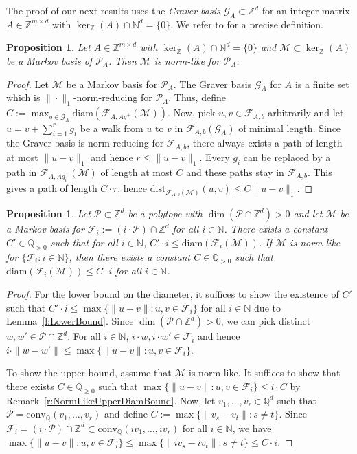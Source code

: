 \documentclass[11pt]{amsart}
\newtheorem{prop}[thm]{Proposition}
\theoremstyle{definition}
\numberwithin{equation}{section}
\newcommand{\ring}[1]{\ensuremath{\mathbb{#1}}}
\renewcommand{\>}{\rangle}
\newcommand{\<}{\langle}
\newcommand{\0}{\mathbf{0}}
\newcommand{\1}{\mathbf{1}}
\newcommand{\2}{\mathbf{2}}
\newcommand\NN{\ring{N}}
\newcommand\QQ{\ring{Q}}
\newcommand\ZZ{\ring{Z}}
\newcommand\cF{{\mathcal F}}
\newcommand\cM{{\mathcal M}}
\newcommand\cP{{\mathcal P}}
\newcommand{\fiber}[2]{\mathcal{F}_{#1,#2}}
\newcommand{\fibergraph}[3]{\mathcal{F}_{#1,#2}\left(#3\right)}
\newcommand{\graver}[1]{\mathcal{G}_{#1}}
\newcommand{\diam}[1]{\mathrm{diam}(#1)}
\newcommand{\dist}[3]{\mathrm{dist}_{#1}(#2,#3)}
\newcommand{\conv}[1]{\mathrm{conv}_\QQ(#1)}
\begin{document}
The proof of our next results uses the \emph{Graver basis}
$\graver{A}\subset\ZZ^d$ for an integer matrix $A\in\ZZ^{m\times d}$
with $\ker_\ZZ(A)\cap\NN^d=\{0\}$. We refer to
\cite[Chapter~3]{Loera2013} for a precise definition.

\begin{prop}\label{p:EveryMBIsNormLike}
Let $A\in\ZZ^{m\times d}$ with $\ker_\ZZ(A)\cap\NN^d=\{0\}$ and
$\cM\subset\ker_\ZZ(A)$ be a Markov basis of $\cP_A$. Then $\cM$ is
norm-like for $\cP_A$.
\end{prop}
\begin{proof}
Let $\cM$ be a Markov basis for $\cP_A$.
The Graver basis $\graver{A}$ for $A$ is a finite set which is
$\|\cdot\|_1$-norm-reducing for $\cP_A$. 
Thus, define
$C:=\max_{g\in\graver{A}}\diam{\fibergraph{A}{Ag^+}{\cM}}$.
Now, pick $u,v\in\fiber{A}{b}$ arbitrarily and let
$u=v+\sum_{i=1}^r g_i$ be a walk from $u$ to $v$ in
$\fibergraph{A}{b}{\graver{A}}$ of minimal length. Since the Graver
basis is norm-reducing for $\fiber{A}{b}$, there always exists a path
of length at most $\|u-v\|_1$ and hence $r\le\|u-v\|_1$. Every $g_i$
can be replaced by a path in $\fibergraph{A}{Ag_i^+}{\cM}$ of length
at most $C$ and these paths stay in $\fiber{A}{b}$. This gives a path
of length $C\cdot r$, hence $\dist{\fibergraph{A}{b}{\cM}}{u}{v}\le
C\|u-v\|_1$.
\end{proof}



\begin{prop}\label{p:DiamBounds}
Let $\cP\subset\ZZ^d$ be a polytope with $\dim(\cP\cap\ZZ^d)>0$ and let $\cM$ be a Markov
basis for $\cF_i:=(i\cdot\cP)\cap\ZZ^d$ for all $i\in\NN$.
There exists a constant $C'\in\QQ_{>0}$ such that for all $i\in\NN$,
$C'\cdot i\le\diam{\cF_i(\cM)}$. If $\cM$ is norm-like for $\{\cF_i:
i\in\NN\}$, then there exists a constant $C\in\QQ_{>0}$ such that 
$\diam{\cF_i(\cM)}\le C\cdot i$ for all $i\in\NN$.
\end{prop}
\begin{proof}
For the lower bound on the diameter, it suffices to show the existence
of $C'$ such that $C'\cdot i\le\max\{\|u-v\|: u,v\in\cF_i\}$ for all
$i\in\NN$ due to Lemma~\ref{l:LowerBound}. Since
$\dim(\cP\cap\ZZ^d)>0$, we can pick distinct $w,w'\in
\cP\cap\ZZ^d$. For all $i\in\NN$, $i\cdot w,i\cdot w'\in\cF_i$
and hence $i\cdot\|w-w'\|\le\max\{\|u-v\|: u,v\in\cF_i\}$. 

To show the upper bound, assume that $\cM$ is norm-like. It suffices
to show that there exists $C\in\QQ_{\ge 0}$ such that $\max\{\|u-v\|:
u,v\in \cF_i\}\le i\cdot C$ by Remark~\ref{r:NormLikeUpperDiamBound}.
Now, let $v_1,\ldots,v_r\in\QQ^d$ such that
$\cP=\conv{v_1,\ldots,v_r}$ and define $C:=\max\{\|v_s-v_t\|: s\neq
t\}$. 
Since $\cF_i=(i\cdot
\cP)\cap\ZZ^d\subset\conv{iv_1,\ldots,iv_r}$ for all
$i\in\NN$, we have
$\max\{\|u-v\|: u,v\in\cF_i\}\le\max\{\|iv_s-iv_t\|: s\neq
t\}\le C\cdot i$. 
\end{proof}
\end{document}
